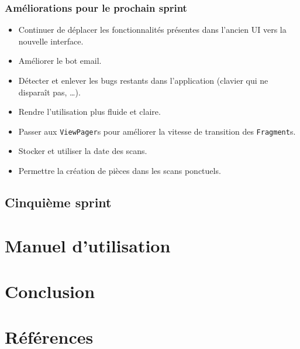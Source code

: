 \documentclass{elsarticle}
\begin{document}
\subsubsection{Améliorations pour le prochain sprint}
\begin{itemize}
	\item Continuer de déplacer les fonctionnalités présentes dans l'ancien UI vers la nouvelle interface.
	\item Améliorer le bot email.
	\item Détecter et enlever les bugs restants dans l'application (clavier qui ne disparaît pas, \ldots).
	\item Rendre l'utilisation plus fluide et claire.
	\item Passer aux \texttt{ViewPager}s pour améliorer la vitesse de transition des \texttt{Fragment}s.
	\item Stocker et utiliser la date des scans.
	\item Permettre la création de pièces dans les scans ponctuels.
\end{itemize}
\subsection{Cinquième sprint}
\section{Manuel d'utilisation}
\section{Conclusion}

\section*{Références}


\end{document}
